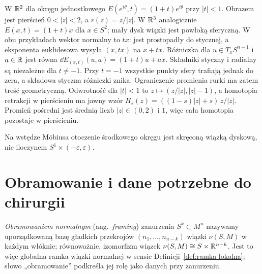 \begin{przyklad}
\label{prz:tuba-okrag-sfera-20}
W $\mathbb{R}^2$ dla okręgu jednostkowego
$E(e^{i\theta},t)=(1+t)e^{i\theta}$
przy $|t|<1$. Obrazem jest pierścień
$0<|z|<2$, a $r(z)=z/|z|$.
W $\mathbb{R}^3$ analogicznie
$E(x,t)=(1+t)x$ dla $x\in S^2$;
mały dysk wiązki jest powłoką
sferyczną.
W obu przykładach wektor normalny to $tx$:
jest prostopadły do stycznej, a eksponenta euklidesowa
wysyła $(x,tx)$ na $x+tx$.
Różniczka dla $u\in T_xS^{n-1}$ i $a\in\mathbb{R}$ jest równa
$\dd E_{(x,t)}(u,a)=(1+t)u+ax$.
Składniki styczny i radialny są niezależne dla $t\ne-1$.
Przy $t=-1$ wszystkie punkty sfery trafiają jednak do zera,
a składowa styczna różniczki znika.
Ograniczenie promienia rurki ma zatem treść geometryczną.
Odwrotność dla $|t|<1$ to
$z\mapsto(z/|z|,|z|-1)$,
a homotopia retrakcji w pierścieniu ma jawny wzór
$H_s(z)=((1-s)|z|+s)\,z/|z|$.
Promień pośredni jest średnią liczb $|z|\in(0,2)$ i $1$,
więc cała homotopia pozostaje w pierścieniu.

Na wstędze Möbiusa
otoczenie środkowego okręgu
jest skręconą wiązką dyskową,
nie iloczynem $S^1\times(-\varepsilon,\varepsilon)$.
\end{przyklad}

\section{Obramowanie i dane potrzebne do chirurgii}
\label{sec:obramowanie-normalne}

\begin{definicja}[Obramowanie]
\label{def:obramowanie-normalne}
\emph{Obramowaniem normalnym} (ang.\ \emph{framing})
zanurzenia $S^k\subset M^n$ nazywamy
uporządkowaną bazę gładkich przekrojów
$(n_1,\ldots,n_{n-k})$ wiązki $\nu(S,M)$
w każdym włóknie; równoważnie,
izomorfizm wiązek
$\nu(S,M)\cong S\times\mathbb{R}^{n-k}$.
Jest to więc globalna ramka wiązki normalnej
w sensie Definicji~\ref{def:ramka-lokalna};
słowo „obramowanie” podkreśla jej rolę jako danych przy zanurzeniu.
\end{definicja}

